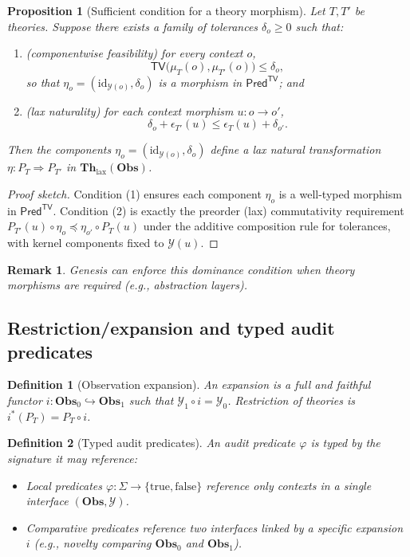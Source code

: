 \documentclass[11pt,a4paper]{article}
\newtheorem{proposition}[theorem]{Proposition}
\newtheorem{definition}{Definition}[section]
\newtheorem{remark}{Remark}[section]
\newcommand{\Obs}{\mathbf{Obs}}
\newcommand{\Th}{\mathbf{Th}}
\newcommand{\TV}{\mathsf{TV}}
\begin{document}
\begin{proposition}[Sufficient condition for a theory morphism]
Let $T,T'$ be theories. Suppose there exists a family of tolerances $\delta_o\ge 0$ such that:
\begin{enumerate}[leftmargin=*]
\item (\emph{componentwise feasibility}) for every context $o$,
\[
\TV\big(\mu_T(o),\mu_{T'}(o)\big)\le \delta_o,
\]
so that $\eta_o=(\mathrm{id}_{\mathcal{Y}(o)},\delta_o)$ is a morphism in $\mathsf{Pred}^{\TV}$; and
\item (\emph{lax naturality}) for each context morphism $u:o\to o'$,
\[
\delta_o+\epsilon_{T'}(u)\le \epsilon_T(u)+\delta_{o'}.
\]
\end{enumerate}
Then the components $\eta_o=(\mathrm{id}_{\mathcal{Y}(o)},\delta_o)$ define a lax natural transformation $\eta:P_T\Rightarrow P_{T'}$ in $\Th_{\mathrm{lax}}(\Obs)$.
\end{proposition}
\begin{proof}[Proof sketch]
Condition (1) ensures each component $\eta_o$ is a well-typed morphism in $\mathsf{Pred}^{\TV}$.
Condition (2) is exactly the preorder (lax) commutativity requirement
$P_{T'}(u)\circ \eta_o \preceq \eta_{o'}\circ P_T(u)$
under the additive composition rule for tolerances, with kernel components fixed to $\mathcal{Y}(u)$.
\end{proof}

\begin{remark}
Genesis can enforce this dominance condition when theory morphisms are required (e.g., abstraction layers).
\end{remark}

\subsection{Restriction/expansion and typed audit predicates}
\begin{definition}[Observation expansion]
An expansion is a full and faithful functor $i:\Obs_0\hookrightarrow\Obs_1$ such that $\mathcal{Y}_1\circ i=\mathcal{Y}_0$.
Restriction of theories is $i^*(P_T)=P_T\circ i$.
\end{definition}

\begin{definition}[Typed audit predicates]
An audit predicate $\varphi$ is \emph{typed} by the signature it may reference:
\begin{itemize}[leftmargin=*]
\item \emph{Local} predicates $\varphi:\Sigma\to\{\mathrm{true,false}\}$ reference only contexts in a single interface $(\Obs,\mathcal{Y})$.
\item \emph{Comparative} predicates reference two interfaces linked by a specific expansion $i$ (e.g., novelty comparing $\Obs_0$ and $\Obs_1$).
\end{itemize}
\end{definition}
\end{document}
